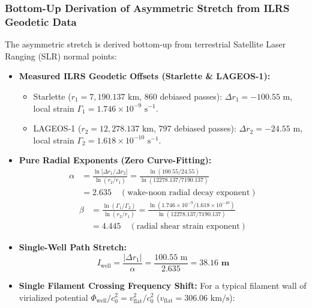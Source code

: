 \documentclass[11pt,a4paper]{article}
\begin{document}
\subsubsection{Bottom-Up Derivation of Asymmetric Stretch from ILRS Geodetic Data}
\label{subsubsec:ilrs_geodetic_derivation}

The asymmetric stretch is derived bottom-up from terrestrial Satellite Laser Ranging (SLR) normal points:
\begin{itemize}
    \item \textbf{Measured ILRS Geodetic Offsets (Starlette \& LAGEOS-1):}
    \begin{itemize}
        \item Starlette ($r_1 = 7,190.137\text{ km}$, 860 debiased passes): $\Delta r_1 = -100.55\text{ m}$, local strain $\Gamma_1 = 1.746 \times 10^{-9}\text{ s}^{-1}$.
        \item LAGEOS-1 ($r_2 = 12,278.137\text{ km}$, 797 debiased passes): $\Delta r_2 = -24.55\text{ m}$, local strain $\Gamma_2 = 1.618 \times 10^{-10}\text{ s}^{-1}$.
    \end{itemize}
    \item \textbf{Pure Radial Exponents (Zero Curve-Fitting):}
    \begin{equation}
    \begin{aligned}
    \alpha &= \frac{\ln|\Delta r_1 / \Delta r_2|}{\ln(r_2 / r_1)} = \frac{\ln(100.55 / 24.55)}{\ln(12278.137 / 7190.137)} \\
    &= \mathbf{2.635} \quad (\text{wake-noon radial decay exponent})
    \end{aligned}
    \end{equation}
    \begin{equation}
    \begin{aligned}
    \beta &= \frac{\ln(\Gamma_1 / \Gamma_2)}{\ln(r_2 / r_1)} = \frac{\ln(1.746 \times 10^{-9} / 1.618 \times 10^{-10})}{\ln(12278.137 / 7190.137)} \\
    &= \mathbf{4.445} \quad (\text{radial shear strain exponent})
    \end{aligned}
    \end{equation}
    \item \textbf{Single-Well Path Stretch:}
    \begin{equation}
    I_{\text{well}} = \frac{|\Delta r_1|}{\alpha} = \frac{100.55\text{ m}}{2.635} = \mathbf{38.16\text{ m}}
    \end{equation}
    \item \textbf{Single Filament Crossing Frequency Shift:} For a typical filament wall of virialized potential $\Phi_{\text{well}}/c_0^2 = v_{\text{flat}}^2/c_0^2$ ($v_{\text{flat}} = 306.06\text{ km/s}$):

\end{itemize}
\end{document}
